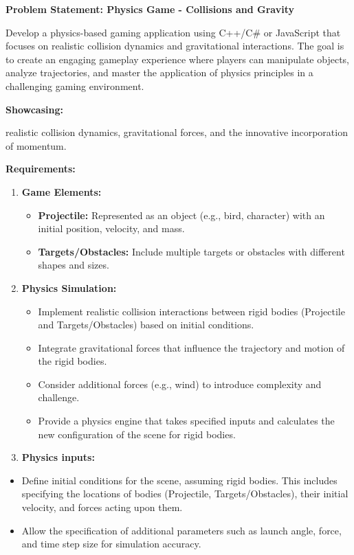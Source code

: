 \documentclass[
]{article}
\author{}
\date{}
\begin{document}
\textbf{Problem Statement: Physics Game - Collisions and Gravity}

Develop a physics-based gaming application using C++/C\# or JavaScript
that focuses on realistic collision dynamics and gravitational
interactions. The goal is to create an engaging gameplay experience
where players can manipulate objects, analyze trajectories, and master
the application of physics principles in a challenging gaming
environment.

\textbf{Showcasing:}

realistic collision dynamics, gravitational forces, and the innovative
incorporation of momentum.

\textbf{Requirements:}

\begin{enumerate}
\def\labelenumi{\arabic{enumi}.}
\item
  \textbf{Game Elements:}

  \begin{itemize}
  \item
    \textbf{Projectile:} Represented as an object (e.g., bird,
    character) with an initial position, velocity, and mass.
  \item
    \textbf{Targets/Obstacles:} Include multiple targets or obstacles
    with different shapes and sizes.
  \end{itemize}
\item
  \textbf{Physics Simulation:}

  \begin{itemize}
  \item
    Implement realistic collision interactions between rigid bodies
    (Projectile and Targets/Obstacles) based on initial conditions.
  \item
    Integrate gravitational forces that influence the trajectory and
    motion of the rigid bodies.
  \item
    Consider additional forces (e.g., wind) to introduce complexity and
    challenge.
  \item
    Provide a physics engine that takes specified inputs and calculates
    the new configuration of the scene for rigid bodies.
  \end{itemize}
\item
  \textbf{Physics inputs:}
\end{enumerate}

\begin{itemize}
\item
  Define initial conditions for the scene, assuming rigid bodies. This
  includes specifying the locations of bodies (Projectile,
  Targets/Obstacles), their initial velocity, and forces acting upon
  them.
\item
  Allow the specification of additional parameters such as launch angle,
  force, and time step size for simulation accuracy.
\end{itemize}
\end{document}
